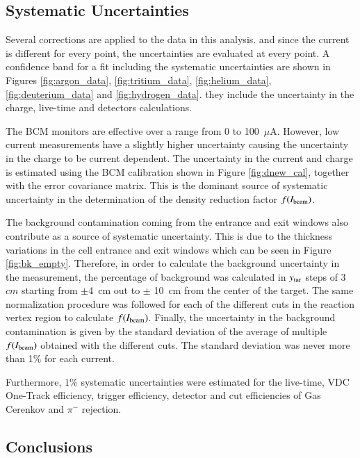 \documentclass[final,5p,times,twocolumn]{elsarticle}
\begin{document}
\subsection{Systematic Uncertainties}

Several corrections are applied to the data in this analysis. and since the current is different for every point, the uncertainties are evaluated at every point.  A confidence band for a fit including the systematic uncertainties are shown in Figures  \ref{fig:argon_data}, \ref{fig:tritium_data}, \ref{fig:helium_data}, \ref{fig:deuterium_data} and \ref{fig:hydrogen_data}. they include the uncertainty in the charge, live-time and detectors calculations.

The BCM monitors are effective over a range from 0 to 100~$\mu$A. However, low current measurements have a slightly higher 
uncertainty causing the uncertainty in the charge to be current dependent. The uncertainty in the current and charge is estimated 
using the BCM calibration shown in Figure \ref{fig:dnew_cal}, together with the error covariance matrix.
This is the dominant source of systematic uncertainty in the determination of the density reduction factor $f(I_{\rm{beam}})$.

The background contamination coming from the entrance and exit windows also contribute as a source of systematic uncertainty. This is due to the thickness variations in the cell entrance and exit windows which can be seen in Figure \ref{fig:bk_empty}. Therefore, in order to calculate the background uncertainty in the measurement, the percentage of background was calculated in $y_{\rm{tar}}$ steps of $3$ $cm$ starting from $\pm$4~cm out to $\pm$ 10~cm from the center of the target.  The same normalization procedure was followed for each of the different cuts in the reaction vertex region to calculate $f(I_{\rm{beam}})$. Finally, the uncertainty in the background contamination is given by the standard deviation of the average of multiple $f(I_{\rm{beam}})$ obtained with the different cuts. The standard deviation was never more than 1$\%$ for each current.

Furthermore, $1\%$ systematic uncertainties were estimated for the live-time, VDC One-Track efficiency, 
trigger efficiency, detector and cut efficiencies of Gas Cerenkov and $\pi^{-}$ rejection.

\subsection {Conclusions }
\end{document}
